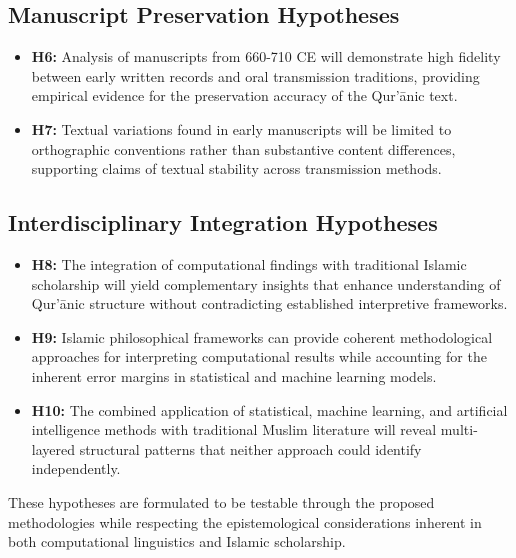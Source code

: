 \subsection{Manuscript Preservation Hypotheses}
\begin{itemize}
    \item \textbf{H6:} Analysis of manuscripts from 660-710 CE will demonstrate high fidelity between early written records and oral transmission traditions, providing empirical evidence for the preservation accuracy of the Qur'\=anic text.

    \item \textbf{H7:} Textual variations found in early manuscripts will be limited to orthographic conventions rather than substantive content differences, supporting claims of textual stability across transmission methods.
\end{itemize}


\subsection{Interdisciplinary Integration Hypotheses}
\begin{itemize}
    \item \textbf{H8:} The integration of computational findings with traditional Islamic scholarship will yield complementary insights that enhance understanding of Qur'\=anic structure without contradicting established interpretive frameworks.

    \item \textbf{H9:} Islamic philosophical frameworks can provide coherent methodological approaches for interpreting computational results while accounting for the inherent error margins in statistical and machine learning models.
    
    \item \textbf{H10:} The combined application of statistical, machine learning, and artificial intelligence methods with traditional Muslim literature will reveal multi-layered structural patterns that neither approach could identify independently.
\end{itemize}

These hypotheses are formulated to be testable through the proposed methodologies while respecting the epistemological considerations inherent in both computational linguistics and Islamic scholarship.
